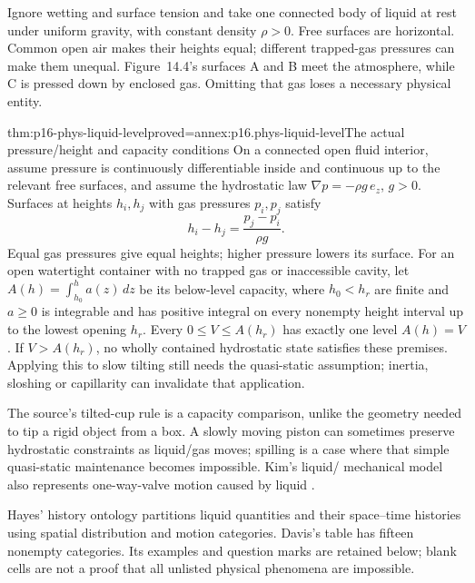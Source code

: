 Ignore wetting and surface tension and take one connected body of liquid
at rest under uniform gravity, with constant density \(\rho>0\).
Free surfaces are horizontal. Common open air makes their heights equal;
different trapped-gas pressures can make them unequal. Figure~14.4's
surfaces A and B meet the atmosphere, while C is pressed down by enclosed
gas. Omitting that gas loses a necessary physical entity.

\begin{hbtheorem}{thm:p16-phys-liquid-level}{proved=annex:p16.phys-liquid-level}{The actual pressure/height and capacity conditions}
On a connected open fluid interior, assume pressure is continuously
differentiable inside and continuous up to the relevant free surfaces,
and assume the hydrostatic law
\(\nabla p=-\rho g\,e_z\), \(g>0\). Surfaces at heights
\(h_i,h_j\) with gas pressures \(p_i,p_j\) satisfy
\[
 h_i-h_j=\frac{p_j-p_i}{\rho g}.
\]
Equal gas pressures give equal heights; higher pressure lowers its surface.
For an open watertight container with no trapped gas or inaccessible cavity,
let \(A(h)=\int_{h_0}^{h}a(z)\,dz\) be its below-level capacity,
where \(h_0<h_r\) are finite and \(a\ge0\) is integrable and has positive integral on every
nonempty height interval up to the lowest opening \(h_r\).
Every \(0\le V\le A(h_r)\) has exactly one level \(A(h)=V\).
If \(V>A(h_r)\), no wholly contained hydrostatic state satisfies these
premises. Applying this to slow tilting still needs the quasi-static
assumption; inertia, sloshing or capillarity can invalidate that application.
\end{hbtheorem}

The source's tilted-cup rule is a capacity comparison, unlike the geometry
needed to tip a rigid object from a box. A slowly moving piston can sometimes
preserve hydrostatic constraints as liquid/gas moves; spilling is a case
where that simple quasi-static maintenance becomes impossible. Kim's liquid/
mechanical model also represents one-way-valve motion caused by liquid
\cite[pp.~608--611]{Davis2008PhysicalReasoning}.

Hayes' history ontology partitions liquid quantities and their space--time
histories using spatial distribution and motion categories. Davis's table
has fifteen nonempty categories. Its examples and question marks are retained
below; blank cells are not a proof that all unlisted physical phenomena
are impossible.

